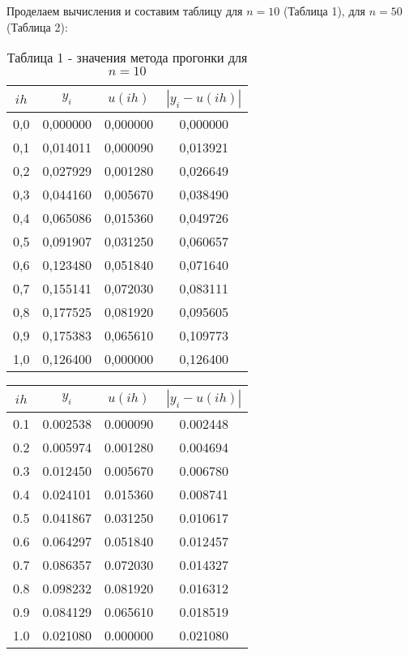 \documentclass[a4paper,12pt]{article}
\begin{document}
{Проделаем вычисления и составим таблицу для $n = 10$ (Таблица 1), для $n = 50$ (Таблица 2):
\begin{table}[h]
    \centering
    \begin{tabular}{|c|c|c|c|}
        \hline
        $ih$ & $y_i$ & $u(ih)$ & $\left|y_i - u(ih)\right|$\\
        \hline
        0,0 & 0,000000  & 0,000000  & 0,000000  \\           
        \hline
        0,1 & 0,014011  & 0,000090  &  0,013921 \\
        \hline
        0,2 & 0,027929 &  0,001280 &  0,026649 \\
        \hline
        0,3 &  0,044160 & 0,005670  &  0,038490 \\
        \hline
        0,4 & 0,065086  & 0,015360  &  0,049726 \\
        \hline
        0,5 & 0,091907  &  0,031250 &  0,060657 \\
        \hline
        0,6 &  0,123480 &  0,051840 &  0,071640 \\
        \hline
        0,7 &  0,155141 & 0,072030  &  0,083111 \\
        \hline
        0,8 & 0,177525  & 0,081920  &  0,095605 \\
        \hline
        0,9 & 0,175383  & 0,065610  &  0,109773 \\
        \hline
        1,0 & 0,126400  & 0,000000  &  0,126400 \\
        \hline
    \end{tabular}
    \caption*{\small{Таблица 1 - значения метода прогонки для $n = 10$}}
\end{table}
\clearpage
\begin{table}[h]
    \centering
    \begin{tabular}{|c|c|c|c|}
        \hline
        $ih$ & $y_i$ & $u(ih)$ & $\left|y_i - u(ih)\right|$\\
        \hline
		0.1 & 0.002538 & 0.000090 & 0.002448 \\ \hline
		0.2 & 0.005974 & 0.001280 & 0.004694 \\ \hline
		0.3 & 0.012450 & 0.005670 & 0.006780 \\ \hline
		0.4 & 0.024101 & 0.015360 & 0.008741 \\ \hline
		0.5 & 0.041867 & 0.031250 & 0.010617 \\ \hline
		0.6 & 0.064297 & 0.051840 & 0.012457 \\ \hline
		0.7 & 0.086357 & 0.072030 & 0.014327 \\ \hline
		0.8 & 0.098232 & 0.081920 & 0.016312 \\ \hline
		0.9 & 0.084129 & 0.065610 & 0.018519 \\ \hline
		1.0 & 0.021080 & 0.000000 & 0.021080 \\ \hline


\end{tabular}
\end{table}}
\end{document}
